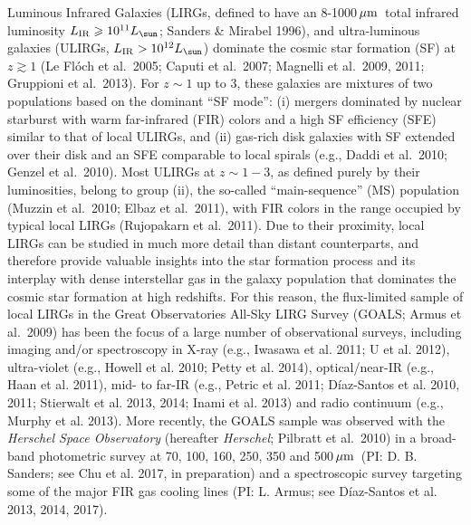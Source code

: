 \documentclass[preprint]{aastex}
\newcommand{\um}{\mbox{$\,\mu{\rm m}$}}
\newcommand{\etal}{et al.~}
\newcommand{\Herschel}{{\it Herschel}}
\begin{document}
Luminous Infrared Galaxies (LIRGs, defined to have an 8-1000\um\ total infrared
luminosity $L_{\rm IR} \geqslant 10^{11}L_{\sun}$; 
Sanders \& Mirabel 1996), and ultra-luminous galaxies (ULIRGs, $L_{\rm IR} > 
10^{12}L_{\sun}$) dominate the cosmic star formation (SF) at $z \gtrsim 1$ 
(Le Fl\'och \etal 2005; Caputi et al.~2007;  Magnelli \etal 2009, 2011; Gruppioni et al.~2013).  
For $z \sim 1$ up to 3, these galaxies are mixtures of two populations based on 
the dominant ``SF mode'': (i) mergers dominated by nuclear starburst with 
warm far-infrared (FIR) colors and a high SF efficiency (SFE) similar to that of 
local ULIRGs,  and (ii) gas-rich disk galaxies with SF extended over their disk
and an SFE comparable to local spirals (e.g., Daddi et al.~2010; Genzel et al.~2010).
Most ULIRGs at $z \sim 1-3$,  as defined purely by their luminosities, 
belong to group (ii), the so-called ``main-sequence'' (MS) population 
(Muzzin et al.~2010;  Elbaz et al.~2011), with FIR colors in the range occupied by 
typical local LIRGs (Rujopakarn et al.~2011).  Due to their proximity, local LIRGs
can be studied in much more detail than distant counterparts, and therefore
provide valuable insights into the star formation process and its interplay with 
dense interstellar gas in the galaxy population that dominates the cosmic star formation 
at high redshifts.  For this reason,  the flux-limited sample of local LIRGs 
in the Great Observatories All-Sky LIRG Survey (GOALS; Armus et al.~2009) has been
the focus of a large number of observational surveys, including 
imaging and/or spectroscopy in X-ray (e.g., Iwasawa et al. 2011; U et al. 2012), ultra-violet 
(e.g., Howell et al. 2010; Petty et al. 2014), optical/near-IR (e.g., Haan et al. 2011), 
mid- to far-IR (e.g., Petric et al. 2011; D\'iaz-Santos et al. 2010, 2011; 
Stierwalt et al. 2013, 2014; Inami et al. 2013) and radio continuum 
(e.g., Murphy et al. 2013). More recently, the GOALS sample was observed with 
the {\it Herschel Space Observatory} (hereafter \Herschel; Pilbratt et al.~2010)
in a broad-band photometric survey at 70, 100, 160, 250, 350 and 500\um\ 
(PI: D. B. Sanders; see Chu et al. 2017, in preparation) and a spectroscopic survey 
targeting some of the major FIR gas cooling lines (PI: L. Armus; see D\'iaz-Santos 
et al. 2013, 2014, 2017).
\end{document}
